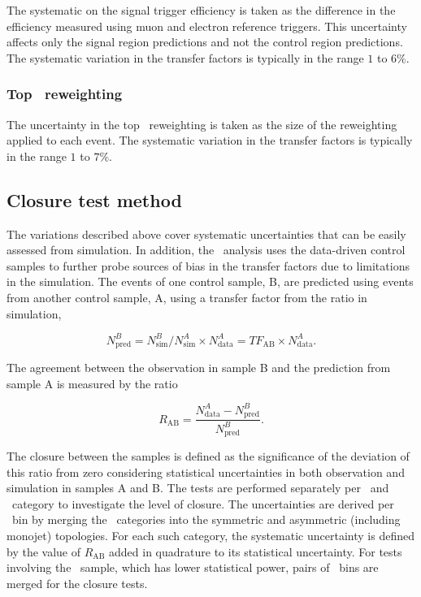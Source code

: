 The systematic on the signal trigger efficiency is taken as the difference in the 
efficiency measured using muon and electron reference triggers. 
This uncertainty affects only the signal region predictions
and not the control region predictions. The systematic variation in the transfer factors is 
typically in the range $1$ to $6\%$.

\subsubsection{Top \pt~reweighting}
\label{sec:topSyst}
The uncertainty in the top \pt~reweighting is taken as the size of the reweighting
applied to each event. The systematic variation in the transfer factors is typically in the range
$1$ to $7\%$.

\subsection{Closure test method}
\label{sec:closure-tests}
The variations described above cover systematic uncertainties that can be easily assessed 
from simulation. In addition, the \alphat~analysis uses the data-driven control samples to
further probe sources of bias in the transfer factors due to limitations in the simulation.
The events of one control sample, B, are predicted using events from another control sample, A,
using a transfer factor from the ratio in simulation, 

\begin{equation}
\label{equ:abPred}
N^{B}_{\text{pred}} = N^{B}_{\text{sim}}/N^{A}_{\text{sim}} \times N^{A}_{\text{data}} = TF_{\text{AB}} \times N^{A}_{\text{data}}.
\end{equation}

The agreement between the observation in sample B and the prediction from sample A is measured by the ratio

\begin{equation}
R_{\text{AB}} = \frac{N^{A}_{\text{data}}-N^{B}_{\text{pred}}}{N^{B}_{\text{pred}}}.
\end{equation}


The closure between the samples is defined as the significance of the deviation of this ratio from zero 
considering statistical uncertainties in both observation and simulation in samples A and B.
The tests are performed separately per \njet~and \scalht~category to investigate the level of closure. 
The uncertainties are derived per \scalht~bin by merging the \njet~categories into 
the symmetric and asymmetric (including monojet) topologies. For each such category, the systematic
uncertainty is defined by the value of $R_{\text{AB}}$ added in quadrature to its statistical uncertainty.
For tests involving the \mmj~sample, which has lower statistical power, pairs of \scalht~bins 
are merged for the closure tests. 

